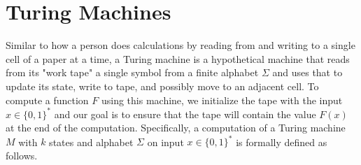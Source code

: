 \section{Turing Machines}

  Similar to how a person does calculations by reading from and writing to a single cell of a paper at a time, a Turing machine is a hypothetical machine that reads from its "work tape" a single symbol from a finite alphabet $\Sigma$ and uses that to update its state, write to tape, and possibly move to an adjacent cell. To compute a function $F$ using this machine, we initialize the tape with the input $x \in \{0,1\}^*$ and our goal is to ensure that the tape will contain the value $F(x)$ at the end of the computation. Specifically, a computation of a Turing machine $M$ with $k$ states and alphabet $\Sigma$ on input $x \in \{0,1\}^*$ is formally defined as follows. 

